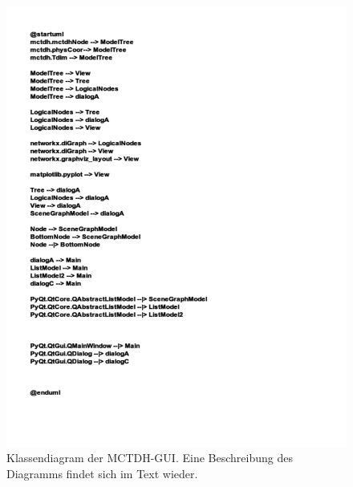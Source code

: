  \begin{figure}
    \centering
    \vspace*{-0.5cm}\includegraphics[width=\textwidth, angle=90, scale=1.4]{figures/umlPyQt}
    \caption{Klassendiagram der MCTDH-GUI. Eine Beschreibung des Diagramms
     findet sich im Text wieder.}\label{fig:uml_PyQt}
\end{figure}

